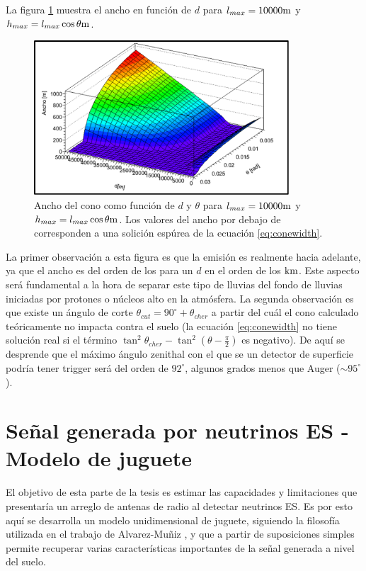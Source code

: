 	La figura \ref{fig:chConeWidth} muestra el ancho en función de $d$ para $l_{max}=10000 \rm m$ y $h_{max}=l_{max}\cos \theta \rm m$.
	\begin{figure}[ht!]
	\centering
		\includegraphics[width=0.85\textwidth]{fig/EASRadio/anchoLluvia}
		\caption{\label{fig:chConeWidth} Ancho del cono \cher{} como función de $d$ y $\theta$ para $l_{max}=10000 \rm m$ y $h_{max}=l_{max}\cos \theta \rm m$. Los valores del ancho por debajo de  corresponden a una solición espúrea de la ecuación \ref{eq:conewidth}.}
	\end{figure}
	La primer observación a esta figura es que la emisión es realmente hacia adelante, ya que el ancho es del orden de los  para un $d$ en el orden de los $\rm km$.
	Este aspecto será fundamental a la hora de separar este tipo de lluvias del fondo de lluvias iniciadas por protones o núcleos alto en la atmósfera.
	La segunda observación es que existe un ángulo de corte $\theta_{cut}=90^\circ+\theta_{cher}$ a partir del cuál el cono \cher{} calculado teóricamente no impacta contra el suelo (la ecuación \ref{eq:conewidth} no tiene solución real si el término $\tan^2 \theta_{cher}-\tan^2 (\theta-\frac{\pi}{2})$ es negativo).
	De aquí se desprende que el máximo ángulo zenithal con el que se un detector de superficie podría tener trigger será del orden de $92^\circ$, algunos grados menos que Auger ($\sim95^\circ$).
	
\section{Señal generada por neutrinos ES - Modelo de juguete}

	El objetivo de esta parte de la tesis es estimar las capacidades y limitaciones que presentaría un arreglo de antenas de radio al detectar neutrinos ES.
	Es por esto aquí se desarrolla un modelo unidimensional de juguete, siguiendo la filosofía utilizada en el trabajo de Alvarez-Muñiz \cite{zhairezAir}, y que a partir de suposiciones simples permite recuperar varias características importantes de la señal generada a nivel del suelo.
	
